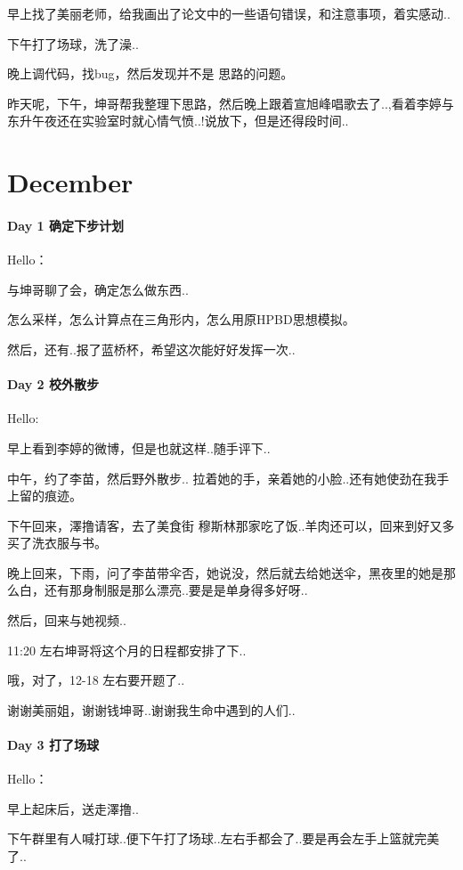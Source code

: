 \documentclass[UTF8,a4paper,8pt]{ctexbook}
\begin{document}
	 	 早上找了美丽老师，给我画出了论文中的一些语句错误，和注意事项，着实感动..
	 	 
	 	 下午打了场球，洗了澡..
	 	 
	 	 晚上调代码，找bug，然后发现并不是 思路的问题。
	 	 
	 	 昨天呢，下午，坤哥帮我整理下思路，然后晚上跟着宣旭峰唱歌去了..,看着李婷与东升午夜还在实验室时就心情气愤..!说放下，但是还得段时间..

 \section*{December}
 	 \paragraph{Day 1   确定下步计划    \quad     }
	 	 Hello：
	 	 
	 	 与坤哥聊了会，确定怎么做东西..
	 	 
	 	 怎么采样，怎么计算点在三角形内，怎么用原HPBD思想模拟。
	 	 
	 	 然后，还有..报了蓝桥杯，希望这次能好好发挥一次..
 	 \paragraph{Day 2   校外散步   \quad     }
	 	 Hello:
	 	 
	 	 早上看到李婷的微博，但是也就这样..随手评下..
	 	 
	 	 中午，约了李苗，然后野外散步.. 拉着她的手，亲着她的小脸..还有她使劲在我手上留的痕迹。
	 	 
	 	 下午回来，澤撸请客，去了美食街 穆斯林那家吃了饭..羊肉还可以，回来到好又多买了洗衣服与书。
	 	 
	 	 晚上回来，下雨，问了李苗带伞否，她说没，然后就去给她送伞，黑夜里的她是那么白，还有那身制服是那么漂亮..要是是单身得多好呀..
	 	 
	 	 然后，回来与她视频..
	 	 
	 	 11:20 左右坤哥将这个月的日程都安排了下..
	 	 
	 	 哦，对了，12-18 左右要开题了..
	 	 
	 	 谢谢美丽姐，谢谢钱坤哥..谢谢我生命中遇到的人们..
 	 \paragraph{Day 3   打了场球    \quad     }
	 	 Hello：
	 	 
	 	 早上起床后，送走澤撸..
	 	 
	 	 下午群里有人喊打球..便下午打了场球..左右手都会了..要是再会左手上篮就完美了..
	 	 
\end{document}
